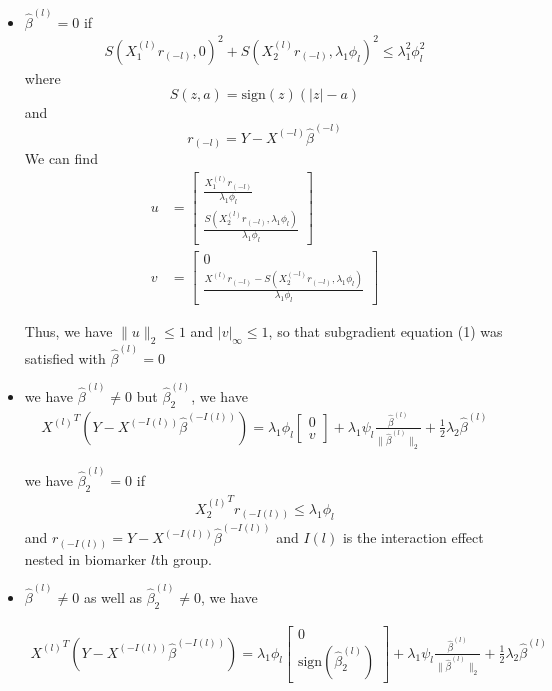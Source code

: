 \documentclass[12pt]{article}
\begin{document}
\begin{itemize}
\item $\hat{\beta}^{(l)}=0$ if 
\begin{align}
S(X_1^{(l)}r_{(-l)},0)^2+S(X_2^{(l)}r_{(-l)},\lambda_1\phi_l)^2\leq \lambda_1^2\phi_l^2
\end{align}
where $$S(z,a)=\text{sign}(z)(|z|-a)$$ and $$r_{(-l)}=Y-X^{(-l)}\hat{\beta}^{(-l)}$$
We can find 
\begin{align}
  u & = \begin{bmatrix}
    \frac{X_1^{(l)}r_{(-l)}}{\lambda_1\phi_l} \\
    \frac{S(X_2^{(l)}r_{(-l)},\lambda_1\phi_l)}{\lambda_1\phi_l}
  \end{bmatrix}
  \\
  v & = \begin{bmatrix}
    0 \\
    \frac{X^{(l)}r_{(-l)}-S(X_2^{(-l)}r_{(-l)},\lambda_1\phi_l)}{\lambda_1\phi_l}
  \end{bmatrix}
\end{align}

Thus, we have $\parallel u\parallel_2\leq 1$ and $|v|_{\infty}\leq 1$, so that subgradient equation (1)
was satisfied with $\hat{\beta}^{(l)}=0$

\item we have $\hat{\beta}^{(l)}\neq 0$ but $\hat{\beta}_2^{(l)}$, we have 
\begin{align}
  {X^{(l)}}^T(Y-X^{(-I(l))}\hat{\beta}^{(-I(l))})=\lambda_1\phi_l \begin{bmatrix}
    0 \\
    v 
  \end{bmatrix}
  + \lambda_1\psi_l \frac{\hat{\beta}^{(l)}}{\parallel \hat{\beta}^{(l)} \parallel_2 } +\frac{1}{2}\lambda_2\hat{\beta}^{(l)}
\end{align}

we have $\hat{\beta}_2^{(l)}=0$ if
\begin{align}
 {X_2^{(l)}}^T r_{(-I(l))}\leq \lambda_1\phi_l  
\end{align}
and $r_{(-I(l))}=Y-X^{(-I(l))}\hat{\beta}^{(-I(l))}$ and $I(l)$ is the interaction effect
nested in biomarker $l$th group.
\item $\hat{\beta}^{(l)}\neq 0$ as well as $\hat{\beta}_2^{(l)}\neq 0$, we have

\begin{align}
  {X^{(l)}}^T(Y-X^{(-I(l))}\hat{\beta}^{(-I(l))})=\lambda_1\phi_l \begin{bmatrix}
    0 \\
    \text{sign}(\hat{\beta}_2^{(l)})
  \end{bmatrix}
  + \lambda_1\psi_l \frac{\hat{\beta}^{(l)}}{\parallel \hat{\beta}^{(l)} \parallel_2 } +\frac{1}{2}\lambda_2\hat{\beta}^{(l)}
\end{align}


\end{itemize}
\end{document}
